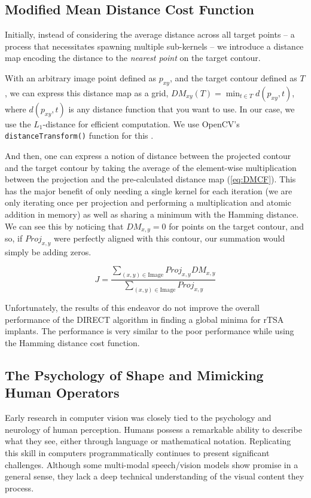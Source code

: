 \subsection{Modified Mean Distance Cost Function}
Initially, instead of considering the average distance across all target points – a process that necessitates spawning multiple sub-kernels – we introduce a distance map encoding the distance to the \emph{nearest point} on the target contour.

With an arbitrary image point defined as $p_{xy}$, and the target contour defined as $T$, we can express this distance map as a grid, $\displaystyle DM_{xy}(T) = \min_{t\in T}d(p_{xy},t)$, where $d(p_{xy},t)$ is any distance function that you want to use. In our case, we use the $L_{1}$-distance for efficient computation. We use OpenCV's \texttt{distanceTransform()} function for this \cite{bradskiOpenCVLibrary2000}.

And then, one can express a notion of distance between the projected contour and the target contour by taking the average of the element-wise multiplication between the projection and the pre-calculated distance map (\cref{eq:DMCF}).
This has the major benefit of only needing a single kernel for each iteration (we are only iterating once per projection and performing a multiplication and atomic addition in memory) as well as sharing a minimum with the Hamming distance.
We can see this by noticing that $DM_{x,y}=0$ for points on the target contour, and so, if $Proj_{x,y}$ were perfectly aligned with this contour, our summation would simply be adding zeros.

\begin{equation}
  \label{eq:DMCF}
  J = \dfrac{ \sum_{(x,y) \in \text{Image}} Proj_{x,y}DM_{x,y} }{\sum_{(x,y)\in \text{Image}}Proj_{x,y}}
\end{equation}

Unfortunately, the results of this endeavor do not improve the overall performance of the DIRECT algorithm in finding a global minima for rTSA implants.
The performance is very similar to the poor performance while using the Hamming distance cost function.

\subsection{The Psychology of Shape and Mimicking Human Operators}
Early research in computer vision was closely tied to the psychology and neurology of human perception.
Humans possess a remarkable ability to describe what they see, either through language or mathematical notation.
Replicating this skill in computers programmatically continues to present significant challenges.
Although some multi-modal speech/vision models show promise in a general sense, they lack a deep technical understanding of the visual content they process.

